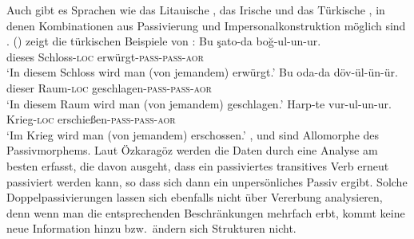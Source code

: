 Auch gibt es Sprachen wie das Litauische \citep[Abschnitt~5]{Timberlake82a}, das
Irische \citep{Noonan94a} und das Türkische \parencites{Ozkaragoez86a}[Abschnitt~2.3.3]{Knecht85a-u}, in denen Kombinationen aus Passivierung und
Impersonalkonstruktion möglich sind \citep{Blevins2003a}. () zeigt
die türkischen Beispiele von \citet[]{Ozkaragoez86a}:
\eal
\ex\label{ex-double-passivization-strangle}
\gll Bu şato-da boğ-ul-un-ur.\\
     dieses Schloss-\textsc{loc} erwürgt-\textsc{pass}-\textsc{pass}-\textsc{aor}\\
\glt `In diesem Schloss wird man (von jemandem) erwürgt.'
\ex\label{ex-double-passivization-hit}
\gll Bu oda-da döv-ül-ün-ür.\\
     dieser Raum-\textsc{loc} geschlagen-\textsc{pass}-\textsc{pass}-\textsc{aor}\\
\glt `In diesem Raum wird man (von jemandem) geschlagen.'
\ex
\gll Harp-te vur-ul-un-ur.\\
     Krieg-\textsc{loc} erschießen-\textsc{pass}-\textsc{pass}-\textsc{aor}\\
\glt `Im Krieg wird man (von jemandem) erschossen.'
\zl
{},  und  sind Allomorphe des Passivmorphems. Laut Özkaragöz werden
die Daten durch eine Analyse am besten erfasst, die davon ausgeht, dass ein passiviertes transitives
Verb erneut passiviert werden kann, so dass sich dann ein unpersönliches Passiv ergibt. Solche
Doppelpassivierungen lassen sich ebenfalls nicht über Vererbung analysieren, denn wenn man die
entsprechenden Beschränkungen mehrfach erbt, kommt keine neue Information hinzu bzw.\ ändern sich
Strukturen nicht.

